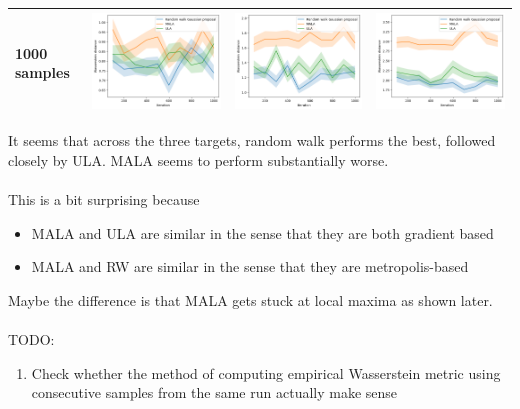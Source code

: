 \documentclass{article}
\theoremstyle{definition}
\newcommand{\1}{\mathbbm{1}}
\begin{document}
{\begin{tabular}{|l|l|l|l|}
	\hline
	1000 samples & \includegraphics[width=.25\linewidth,valign=m]{Different targets/t12.png} & \includegraphics[width=.25\linewidth,valign=m]{Different targets/t22.png} & \includegraphics[width=.25\linewidth,valign=m]{Different targets/t32.png}\\
	\hline
\end{tabular}
}
\newpage
It seems that across the three targets, random walk performs the best, followed closely by ULA. MALA seems to perform substantially worse.
\\\\
This is a bit surprising because

\begin{itemize}
	\item MALA and ULA are similar in the sense that they are both gradient based
	
	\item MALA and RW are similar in the sense that they are metropolis-based
\end{itemize}
Maybe the difference is that MALA gets stuck at local maxima as shown later.
\\\\
TODO: 
\begin{enumerate}
	\item Check whether the method of computing empirical Wasserstein metric using consecutive samples from the same run actually make sense
\end{enumerate}


\newpage
\end{document}
